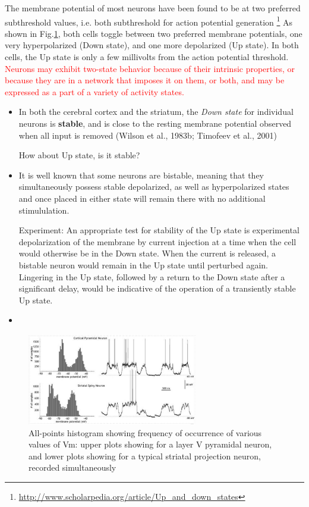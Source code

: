 The membrane potential of most neurons have been found to be at two preferred
subthreshold values, i.e. both subthreshold for action potential generation
\footnote{\url{http://www.scholarpedia.org/article/Up_and_down_states}}
As shown in Fig.\ref{fig:Vm-neuron-Up-Down-state}, both cells toggle between two
preferred membrane potentials, one very hyperpolarized (Down state), and one
more depolarized (Up state). In both cells, the Up state is only a few
millivolts from the action potential threshold.
\textcolor{red}{ Neurons may exhibit two-state behavior because of their
intrinsic properties, or because they are in a network that imposes it on them,
or both, and may be expressed as a part of a variety of activity states.}
\begin{itemize}
  
  \item In both the cerebral cortex and the striatum, the {\it Down state} for
  individual neurons is {\bf stable}, and is close to the resting membrane
  potential observed when all input is removed (Wilson et al., 1983b; Timofeev et al.,
  2001)
  
  How about Up state, is it stable?
  
  \item It is well known that some neurons are bistable, meaning that they
  simultaneously possess stable depolarized, as well as hyperpolarized states
  and once placed in either state will remain there with no additional
  stimululation.
  
 Experiment: An appropriate test for stability of the Up state is experimental
 depolarization of the membrane by current injection at a time when the cell
 would otherwise be in the Down state. When the current is released, a bistable
 neuron would remain in the Up state until perturbed again. Lingering in the Up
 state, followed by a return to the Down state after a significant delay, would
 be indicative of the operation of a transiently stable Up state.
 
  \item 
\end{itemize}

 \begin{figure}[htb]
\centerline{\includegraphics[height=4cm]{./images/Vm-neuron-Up-Down-state.eps}}
\caption{All-points histogram showing
frequency of occurrence of various values of
Vm: upper plots showing for a layer V
pyramidal neuron, and lower plots showing
for a typical striatal projection neuron,
recorded simultaneously}\label{fig:Vm-neuron-Up-Down-state}
\end{figure} 


